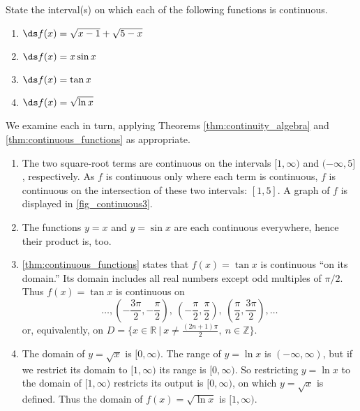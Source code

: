\begin{example}\label{ex_cont_funct}
State the interval(s) on which each of the following functions is continuous.
\begin{multicols}{2}
	\begin{enumerate}
		\item	$\ds f(x) = \sqrt{x-1} + \sqrt{5-x}$
		\item	$\ds f(x) = x\sin x$
		\item	$\ds f(x) = \tan x$
		\item	$\ds f(x) = \sqrt{\ln x}$
	\end{enumerate}
\end{multicols}
\solution
We examine each in turn, applying Theorems \ref{thm:continuity_algebra} and \ref{thm:continuous_functions} as appropriate.


\begin{enumerate}
	\item	The two square-root terms are continuous on the intervals $[1,\infty)$ and $(-\infty,5]$, respectively. As $f$ is continuous only where each term is continuous, $f$ is continuous on the intersection of these two intervals: $[1,5]$. A graph of $f$ is displayed in \autoref{fig_continuous3}.

	\item	The functions $y=x$ and $y=\sin x$ are each continuous everywhere, hence their product is, too.
	\item	\autoref{thm:continuous_functions} states that $f(x) = \tan x$ is continuous ``on its domain.'' Its domain includes all real numbers except odd multiples of $\pi/2$. Thus $f(x) = \tan x$ is continuous on
	\[
	\dotsc, \left(-\frac{3\pi}{2},-\frac{\pi}2\right),\ \left(-\frac{\pi}2,\frac{\pi}2\right),\ \left(\frac{\pi}2,\frac{3\pi}2\right),\dotsc
	\]
	or, equivalently, on $D = \{x\in \mathbb{R}\ \vert\ x\neq \frac{(2n+1)\pi}2,\ n\in\mathbb{Z}\}$.
	\item	The domain of $y = \sqrt{x}$ is $[0,\infty)$. The range of $y=\ln x$ is $(-\infty,\infty)$, but if we restrict its domain to $[1,\infty)$ its range is $[0,\infty)$. So restricting $y = \ln x$ to the domain of $[1,\infty)$ restricts its output is $[0,\infty)$, on which $y = \sqrt{x}$ is defined. Thus the domain of $f(x) = \sqrt{\ln x}$ is $[1,\infty)$.
\end{enumerate}
\end{example}

